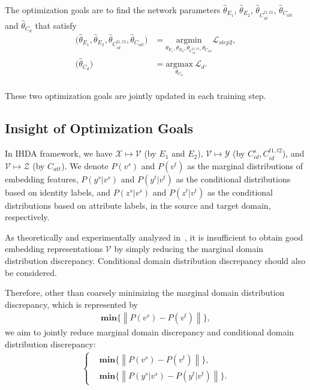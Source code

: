 \documentclass[journal]{IEEEtran}
\begin{document}
The optimization goals are to find the network parameters $\hat{\theta }_{E_{1}}$, $\hat{\theta }_{E_{2}}$, $\hat{\theta }_{C^{t1,t2}_{id}}$, $\hat{\theta }_{C_{att}}$ and $\hat{\theta }_{C_{d}}$ that satisfy
\begin{equation}
\begin{split}
\big( \hat{\theta }_{E_{1}}, \hat{\theta }_{E_{2}}, \hat{\theta}_{C^{t1,t2}_{id}}, \hat{\theta}_{C_{att}} \big) &= \underset{\theta_{E_{1}},\theta_{E_{2}},\theta_{C^{t1,t2}_{id}},\theta_{C_{att}}}{\mathrm{argmin}}\mathcal{L}_{step2}  ,\\
\big(\hat{\theta}_{C_{d}}\big) &=  \underset{\theta_{C_{d}}}{\mathrm{argmax}}
~\mathcal{L}_{d} .\\
\end{split}
\end{equation}

These two optimization goals are jointly updated in each training step.


\subsection{Insight of Optimization Goals}

In IHDA framework, we have $\mathcal{X} \mapsto \mathcal{V}$ (by $E_1$ and $E_2$), $ \mathcal{V} \mapsto \mathcal{Y}$ (by $C^{s}_{id}, C^{t1,t2}_{id}$), and $\mathcal{V} \mapsto \mathcal{Z}$ (by $C_{att}$). We denote $P(v^{s})$ and $P(v^{t})$ as the marginal distributions of embedding features, $P(y^{s}|v^{s})$ and $P(y^{t}|v^{t})$ as the conditional distributions based on identity labels, and $P(z^{s}|v^{s})$ and $P(z^{t}|v^{t})$ as the conditional distributions based on attribute labels, in the source and target domain, respectively.

As theoretically and experimentally analyzed in~\cite{long2013transfer,saito2017asymmetric, long2017deep,zhang2017joint,wang2017balanced,zhao2019learning}, it is insufficient to obtain good embedding representations $\mathcal{V}$ by simply reducing the marginal domain distribution discrepancy. Conditional domain distribution discrepancy should also be considered. 

Therefore, other than coarsely minimizing the marginal domain distribution discrepancy, which is represented by
\begin{equation}
\begin{split}
\textbf{min}\{\left \|P(v^{s})-P(v^{t})\right \|\},
\label{eq:ideal_goal}
\end{split}
\end{equation}
we aim to jointly reduce marginal domain discrepancy and conditional domain distribution discrepancy: 
\begin{equation}
\begin{split}
\left\{\begin{matrix}
&\textbf{min}\{\left \|P(v^{s})-P(v^{t})\right \|\},\\
&\textbf{min}\{\left \|P(y^{s}|v^{s})-P(y^{t}|v^{t})\right \|\}.
\end{matrix}\right.
\label{eq:ideal_goal_2}
\end{split}
\end{equation}
\end{document}
